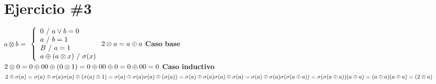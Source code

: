 \documentclass[11pt,a4paper]{article}
\begin{document}
\section*{Ejercicio \#3}
$ a \otimes b = $
$\left\{
	\begin{array}{ll}
		0   \mbox{ / }  a\vee b=0 \\
		a  \mbox{ / }  b=1 \\  
		B \mbox{ / }  a=1 \\
		a\oplus(a\otimes x) \mbox{ / }  \sigma (x)
	\end{array}
\right.
\\
2 \otimes a = a\oplus a \\
$
\textbf{Caso base}\\
$
2 \otimes 0 = 0 \oplus 0 \\
0 \oplus (0 \otimes 1) = 0 \oplus 0 \\
0 \oplus 0 = 0 \oplus 0 \\
0 = 0\\
$
\textbf{Caso inductivo }\\
$
2 \otimes \sigma (a) = \sigma (a) \oplus \sigma (a) \\ 
\sigma (a) \oplus (\sigma (a) \otimes 1) = \sigma (a) \oplus \sigma (a)\\
\sigma (a) \oplus (\sigma (a)) = \sigma (a) \oplus \sigma (a)\\
\sigma (a) \oplus \sigma (a) = \sigma (a) \oplus \sigma (a)\\
\sigma (\sigma (a \oplus a)) = \sigma (\sigma (a \oplus a)) \\
(a \oplus a) = (a \oplus a) \\
(a \oplus a) = (2 \otimes a)
$
\end{document}
